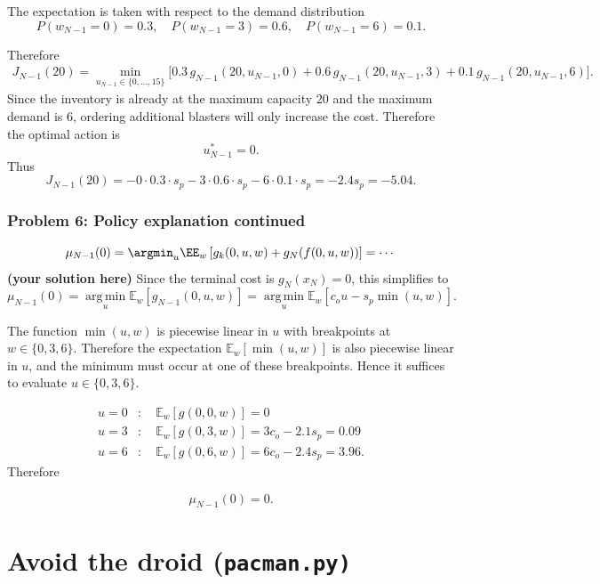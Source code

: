 \documentclass[12pt,twoside]{article}
\newcommand\redt[1]{ {\textcolor[rgb]{0.60, 0.00, 0.00}{\textbf{ #1} } } }
\newcommand{\yoursolution}{ \redt{(your solution here) } }
\begin{document}
    The expectation is taken with respect to the demand distribution
    $$
    P(w_{N-1}=0)=0.3, \quad
    P(w_{N-1}=3)=0.6, \quad
    P(w_{N-1}=6)=0.1.
    $$
    
    Therefore
    \begin{align}
    J_{N-1}(20) = \min_{u_{N-1}\in\{0,\dots,15\}}
    \Big[
    0.3\, g_{N-1}(20,u_{N-1},0) +
    0.6\, g_{N-1}(20,u_{N-1},3) +
    0.1\, g_{N-1}(20,u_{N-1},6)
    \Big].
    \end{align}
    Since the inventory is already at the maximum capacity $20$ and the maximum demand is $6$, ordering additional blasters will only increase the cost. Therefore the optimal action is
    $$
    u_{N-1}^* = 0.
    $$
    Thus
    $$
    J_{N-1}(20) = -0\cdot0.3\cdot s_{p} - 3\cdot0.6\cdot s_{p} - 6\cdot0.1\cdot s_{p} =-2.4s_{p}=-5.04.
    $$
	
\subsubsection*{{\color{red}Problem 6:  Policy explanation continued}}
	
	$$\mu_{N-1}(0) = \argmin_u \EE_{w} \left[g_k(0, u, w) + g_N( f(0,u,w) ) \right] = \cdots $$
\yoursolution
Since the terminal cost is $g_N(x_N)=0$, this simplifies to
$$
\mu_{N-1}(0) =
\operatorname*{arg\,min}_u \mathbb{E}_{w}\left[g_{N-1}(0,u,w)\right] = \operatorname*{arg\,min}_u \mathbb{E}_{w}\left[c_{o}u - s_{p}\min(u,w)\right]  .
$$

The function $\min(u,w)$ is piecewise linear in $u$ with breakpoints at
$w\in\{0,3,6\}$. Therefore the expectation $\mathbb{E}_{w}[\min(u,w)]$
is also piecewise linear in $u$, and the minimum must occur at one of
these breakpoints. Hence it suffices to evaluate $u\in\{0,3,6\}$.

\[
\begin{aligned}
u=0 &: \quad \mathbb{E}_{w}[g(0,0,w)] = 0 \\
u=3 &: \quad \mathbb{E}_{w}[g(0,3,w)] = 3c_{o}-2.1s_{p} = 0.09\\
u=6 &: \quad \mathbb{E}_{w}[g(0,6,w)] = 6c_{o}-2.4s_{p} =  3.96.
\end{aligned}
\]
Therefore

$$
\mu_{N-1}(0)=0.
$$
\section{Avoid the droid (\texttt{pacman.py)}} 
\end{document}
